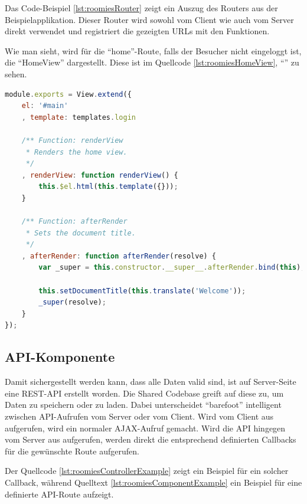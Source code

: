 Das Code-Beispiel \ref{lst:roomiesRouter} zeigt ein Auszug des Routers aus der Beispielapplikation.
Dieser Router wird sowohl vom Client wie auch vom Server direkt verwendet und registriert die gezeigten URLs mit den Funktionen.

Wie man sieht, wird für die ``home''-Route, falls der Besucher nicht eingeloggt ist,
die ``HomeView'' dargestellt. Diese ist im Quellcode \ref{lst:roomiesHomeView}, ``'' zu sehen.

\begin{lstlisting}[language=JavaScript, caption=Router der Beispielapplikation, label=lst:roomiesHomeView]
module.exports = View.extend({
	el: '#main'
	, template: templates.login

	/** Function: renderView
	 * Renders the home view.
	 */
	, renderView: function renderView() {
		this.$el.html(this.template({}));
	}

	/** Function: afterRender
	 * Sets the document title.
	 */
	, afterRender: function afterRender(resolve) {
		var _super = this.constructor.__super__.afterRender.bind(this);

		this.setDocumentTitle(this.translate('Welcome'));
		_super(resolve);
	}
});
\end{lstlisting}

\subsection{API-Komponente}
Damit sichergestellt werden kann, dass alle Daten valid sind, ist auf Server-Seite
eine REST-API \cite{REST} erstellt worden. Die Shared Codebase greift auf diese zu, um
Daten zu speichern oder zu laden.
Dabei unterscheidet ``barefoot'' intelligent zwischen API-Aufrufen vom Server oder vom Client.
Wird vom Client aus aufgerufen, wird ein normaler AJAX-Aufruf gemacht. Wird die API
hingegen vom Server aus aufgerufen, werden direkt die entsprechend definierten
Callbacks für die gewünschte Route aufgerufen.

Der Quellcode \ref{lst:roomiesControllerExample} zeigt ein Beispiel für ein solcher
Callback, während Quelltext \ref{lst:roomiesComponentExample} ein Beispiel für
eine definierte API-Route aufzeigt.

